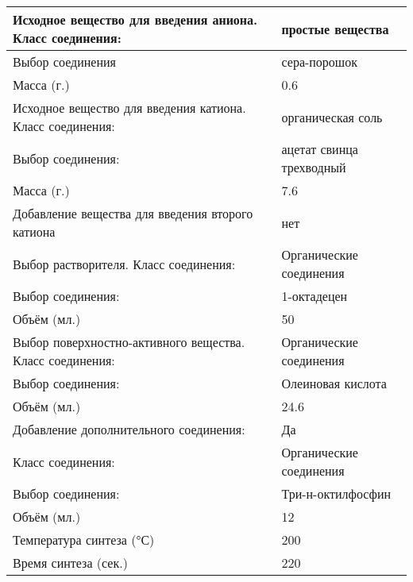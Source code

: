 \begin{enumerate}
    \begin{table}[H]
        \begin{center}
            \begin{tabular}{|p{9cm}|p{5cm}|}
                \hline
                Исходное вещество для введения аниона. Класс соединения:	&простые вещества \\
                \hline
                Выбор соединения	&сера-порошок \\
                \hline
                Масса (г.)&	0.6 \\
                \hline
                Исходное вещество для введения катиона. Класс соединения:&	органическая соль \\
                \hline
                Выбор соединения:	&ацетат свинца трехводный \\
                \hline
                Масса (г.)&	7.6 \\
                \hline
                Добавление вещества для введения второго катиона	&нет \\
                \hline
                Выбор растворителя. Класс соединения:	&Органические соединения \\
                \hline
                Выбор соединения:	&1-октадецен \\
                \hline
                Объём (мл.)	& 50 \\
                \hline
                Выбор поверхностно-активного вещества. Класс соединения:	&Органические соединения \\
                \hline
                Выбор соединения:&	Олеиновая кислота \\
                \hline
                Объём (мл.)&	24.6 \\
                \hline
                Добавление дополнительного соединения:	&Да \\
                \hline
                Класс соединения:	&Органические соединения \\
                \hline
                Выбор соединения:	&Три-н-октилфосфин \\
                \hline
                Объём (мл.)&	12 \\
                \hline
                Температура синтеза (°С)	&200 \\
                \hline
                Время синтеза (сек.)&	220 \\
                \hline
            \end{tabular}
        \end{center}
    \end{table}


\end{enumerate}
